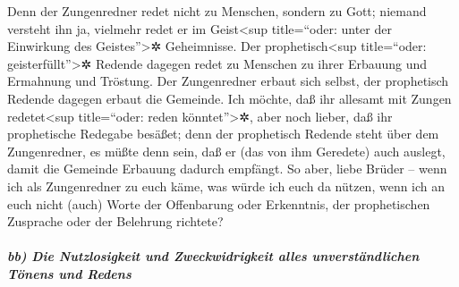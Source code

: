  Denn der Zungenredner redet nicht zu Menschen, sondern zu
Gott; niemand versteht ihn ja, vielmehr redet er im Geist\textless sup
title=``oder: unter der Einwirkung des Geistes''\textgreater✲
Geheimnisse.  Der prophetisch\textless sup title=``oder:
geisterfüllt''\textgreater✲ Redende dagegen redet zu Menschen zu ihrer
Erbauung und Ermahnung und Tröstung.  Der Zungenredner
erbaut sich selbst, der prophetisch Redende dagegen erbaut die Gemeinde.
 Ich möchte, daß ihr allesamt mit Zungen
redetet\textless sup title=``oder: reden könntet''\textgreater✲, aber
noch lieber, daß ihr prophetische Redegabe besäßet; denn der prophetisch
Redende steht über dem Zungenredner, es müßte denn sein, daß er (das von
ihm Geredete) auch auslegt, damit die Gemeinde Erbauung dadurch
empfängt.  So aber, liebe Brüder -- wenn ich als
Zungenredner zu euch käme, was würde ich euch da nützen, wenn ich an
euch nicht (auch) Worte der Offenbarung oder Erkenntnis, der
prophetischen Zusprache oder der Belehrung richtete?

\hypertarget{bb-die-nutzlosigkeit-und-zweckwidrigkeit-alles-unverstuxe4ndlichen-tuxf6nens-und-redens}{%
\subparagraph{bb) Die Nutzlosigkeit und Zweckwidrigkeit alles
unverständlichen Tönens und
Redens}\label{bb-die-nutzlosigkeit-und-zweckwidrigkeit-alles-unverstuxe4ndlichen-tuxf6nens-und-redens}}

